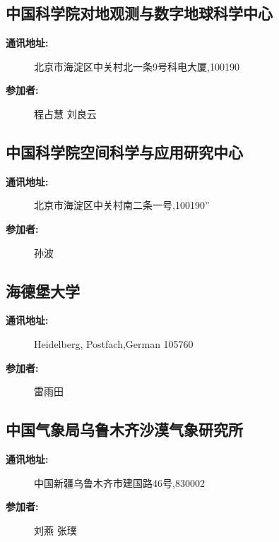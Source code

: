 \documentclass[letterpaper,10pt,english]{sphinxmanual}
\begin{document}
\subsection{中国科学院对地观测与数字地球科学中心}
\label{water_partner:id19}\begin{description}
\item[{\textbf{通讯地址:}}] \leavevmode
北京市海淀区中关村北一条9号科电大厦,100190

\item[{\textbf{参加者:}}] \leavevmode
程占慧
刘良云

\end{description}


\subsection{中国科学院空间科学与应用研究中心}
\label{water_partner:id20}\begin{description}
\item[{\textbf{通讯地址:}}] \leavevmode
北京市海淀区中关村南二条一号,100190''

\item[{\textbf{参加者:}}] \leavevmode
孙波

\end{description}


\subsection{海德堡大学}
\label{water_partner:id21}\begin{description}
\item[{\textbf{通讯地址:}}]  Heidelberg, Postfach,German 105760

\item[{\textbf{参加者:}}] \leavevmode
雷雨田

\end{description}


\subsection{中国气象局乌鲁木齐沙漠气象研究所}
\label{water_partner:id22}\begin{description}
\item[{\textbf{通讯地址:}}] \leavevmode
中国新疆乌鲁木齐市建国路46号,830002

\item[{\textbf{参加者:}}] \leavevmode
刘燕
张璞

\end{description}
\end{document}
